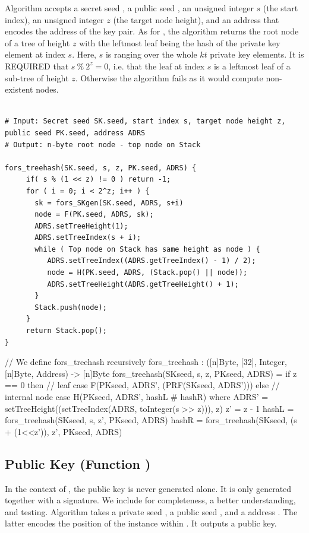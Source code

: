    Algorithm \forstreehash accepts a secret seed \sseed,
   a public seed \pseed, an unsigned integer $s$ (the start index), an
   unsigned integer $z$ (the target node height), and an address \adrs that
   encodes the address of the \fors key pair. As for \treehash, the
   \forstreehash algorithm returns the root node of a tree of height $z$ with
   the leftmost leaf being the hash of the private key element at index $s$. 
   Here, $s$ is ranging over the whole $kt$ private key elements.
   It is REQUIRED that $s\ \%\ 2^z = 0$, i.e. that the leaf at index $s$ is a
   leftmost leaf of a sub-tree of height $z$.  Otherwise the algorithm fails
   as it would compute non-existent nodes.  
   
   \begin{lstlisting}[breaklines=true, label=algo:forstreehash, language=pseudoc,
                   caption=The \forstreehash algorithm.]

# Input: Secret seed SK.seed, start index s, target node height z, public seed PK.seed, address ADRS
# Output: n-byte root node - top node on Stack

fors_treehash(SK.seed, s, z, PK.seed, ADRS) {
     if( s % (1 << z) != 0 ) return -1;
     for ( i = 0; i < 2^z; i++ ) {
       sk = fors_SKgen(SK.seed, ADRS, s+i) 
       node = F(PK.seed, ADRS, sk);
       ADRS.setTreeHeight(1);
       ADRS.setTreeIndex(s + i);
       while ( Top node on Stack has same height as node ) {
          ADRS.setTreeIndex((ADRS.getTreeIndex() - 1) / 2);
          node = H(PK.seed, ADRS, (Stack.pop() || node));
          ADRS.setTreeHeight(ADRS.getTreeHeight() + 1);
       }
       Stack.push(node);
     }
     return Stack.pop();
}

\end{lstlisting}

\begin{code}
  // We define fors_treehash recursively
  fors_treehash : ([n]Byte, [32], Integer, [n]Byte, Address) -> [n]Byte
  fors_treehash(SKseed, s, z, PKseed, ADRS) =
    if z == 0 then
    // leaf case
      F(PKseed, ADRS', (PRF(SKseed, ADRS')))
    else
      // internal node case
      H(PKseed, ADRS', hashL # hashR)
    where
      ADRS' = setTreeHeight((setTreeIndex(ADRS, toInteger(s >> z))), z)
      z' = z - 1
      hashL = fors_treehash(SKseed, s, z', PKseed, ADRS)
      hashR = fors_treehash(SKseed, (s + (1<<z')), z', PKseed, ADRS)
\end{code}

\subsection{\fors Public Key (Function \forspkgen)}
In the context of \spx, the \fors public key is never generated alone. It is 
only generated together with a signature. We include \forspkgen
for completeness, a better understanding, and testing. Algorithm \forspkgen takes 
a private seed \sseed, a public seed \pseed, and a \fors address \adrs. The 
latter encodes the position of the \fors instance within \spx. It outputs a 
\fors public key.


